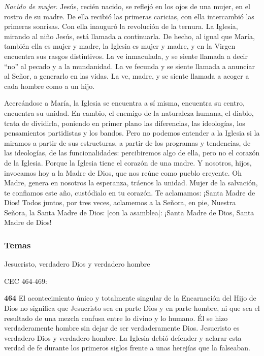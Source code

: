 \documentclass[]{article}
\begin{document}
\emph{Nacido de mujer}. Jesús, recién nacido, se reflejó en los ojos de
una mujer, en el rostro de su madre. De ella recibió las primeras
caricias, con ella intercambió las primeras sonrisas. Con ella inauguró
la revolución de la ternura. La Iglesia, mirando al niño Jesús, está
llamada a continuarla. De hecho, al igual que María, también ella es
mujer y madre, la Iglesia es mujer y madre, y en la Virgen encuentra sus
rasgos distintivos. La ve inmaculada, y se siente llamada a decir ``no''
al pecado y a la mundanidad. La ve fecunda y se siente llamada a
anunciar al Señor, a generarlo en las vidas. La ve, madre, y se siente
llamada a acoger a cada hombre como a un hijo.

Acercándose a María, la Iglesia se encuentra a sí misma, encuentra su
centro, encuentra su unidad. En cambio, el enemigo de la naturaleza
humana, el diablo, trata de dividirla, poniendo en primer plano las
diferencias, las ideologías, los pensamientos partidistas y los bandos.
Pero no podemos entender a la Iglesia si la miramos a partir de sus
estructuras, a partir de los programas y tendencias, de las ideologías,
de las funcionalidades: percibiremos algo de ella, pero no el corazón de
la Iglesia. Porque la Iglesia tiene el corazón de una madre. Y nosotros,
hijos, invocamos hoy a la Madre de Dios, que nos reúne como pueblo
creyente. Oh Madre, genera en nosotros la esperanza, tráenos la unidad.
Mujer de la salvación, te confiamos este año, custódialo en tu corazón.
Te aclamamos: ¡Santa Madre de Dios! Todos juntos, por tres veces,
aclamemos a la Señora, en pie, Nuestra Señora, la Santa Madre de Dios:
{[}con la asamblea{]}: ¡Santa Madre de Dios, Santa Madre de
Dios!\protect\hypertarget{_Ref448598744}{}{\protect\hypertarget{_Toc448662845}{}{\protect\hypertarget{_Toc448690364}{}{}}}



\subsubsection{Temas}\label{temas-9}

Jesucristo, verdadero Dios y verdadero hombre

CEC 464-469:

\textbf{464} El acontecimiento único y totalmente singular de la
Encarnación del Hijo de Dios no significa que Jesucristo sea en parte
Dios y en parte hombre, ni que sea el resultado de una mezcla confusa
entre lo divino y lo humano. Él se hizo verdaderamente hombre sin dejar
de ser verdaderamente Dios. Jesucristo es verdadero Dios y verdadero
hombre. La Iglesia debió defender y aclarar esta verdad de fe durante
los primeros siglos frente a unas herejías que la falseaban.
\end{document}
